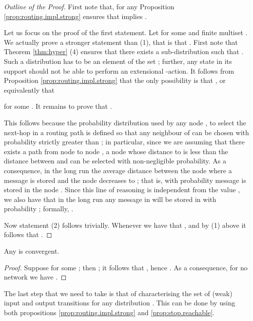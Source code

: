 \documentclass{LMCS}
\begin{document}
\begin{proof}[Outline of the Proof]
First note that, for any  
Proposition \ref{prop:routing.impl.strong} 
ensures that  
implies . 

Let us focus on the proof of the first statement.
Let  
for some  and finite multiset . 
We actually prove a stronger statement than (1), 
that is that . 
First note that Theorem \ref{thm:hyper} (4) 
ensures that there exists a sub-distribution 
 such that . 
Such a distribution  has to be an element 
of the set ; 
further, any state in its support should not be 
able to perform an extensional -action. 
It follows from Proposition \ref{prop:routing.impl.strong} 
that the only possibility is that , or equivalently that 
 
for some . It remains to prove that 
.

This follows because the probability distribution used 
by any node , to select the next-hop in a 
routing path is defined so that any neighbour of 
 can be chosen with probability strictly greater 
than ; in particular, since we are 
assuming that there exists a path from node  to node , 
a node  whose distance to  is less than the 
distance between  and  can be selected with 
non-negligible probability. As a consequence, in 
the long run the average distance between the node 
where a message  is stored and 
the node  decreases to ; that is, 
with probability  message  is stored in 
the node . 
Since this line of reasoning is independent from 
the value , we also have that in the long run 
any message in  
will be stored in  with probability ; 
formally, .

Now statement (2) follows trivially. Whenever  
we have that , and 
by (1) above it follows that . 
\end{proof}

\begin{cor}
\label{cor:impl.convergent}
Any  is 
convergent.
\end{cor}

\begin{proof}
Suppose  for some ; 
then ; 
it follows that , 
hence . As a consequence, 
for no network  we have 
.
\end{proof}

The last step that we need to take is that of 
characterising the set of (weak) input and output 
transitions for any distribution . This 
can be done by using both propositions 
\ref{prop:routing.impl.strong} and 
\ref{prop:stop.reachable}.
\end{document}
